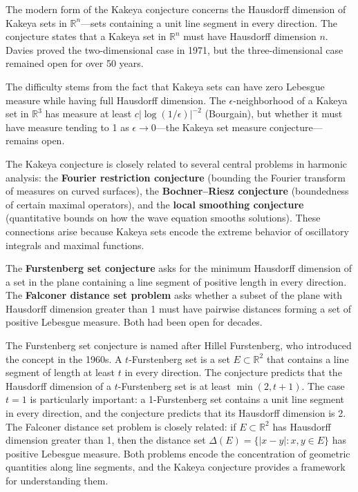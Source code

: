 The modern form of the Kakeya conjecture concerns the Hausdorff dimension of Kakeya sets in $\mathbb{R}^n$---sets containing a unit line segment in every direction. The conjecture states that a Kakeya set in $\mathbb{R}^n$ must have Hausdorff dimension $n$. Davies proved the two-dimensional case in 1971, but the three-dimensional case remained open for over 50 years.

The difficulty stems from the fact that Kakeya sets can have zero Lebesgue measure while having full Hausdorff dimension. The $\epsilon$-neighborhood of a Kakeya set in $\mathbb{R}^3$ has measure at least $c|\log(1/\epsilon)|^{-2}$ (Bourgain), but whether it must have measure tending to 1 as $\epsilon\to 0$---the Kakeya set measure conjecture---remains open.

The Kakeya conjecture is closely related to several central problems in harmonic analysis: the \textbf{Fourier restriction conjecture} (bounding the Fourier transform of measures on curved surfaces), the \textbf{Bochner--Riesz conjecture} (boundedness of certain maximal operators), and the \textbf{local smoothing conjecture} (quantitative bounds on how the wave equation smooths solutions). These connections arise because Kakeya sets encode the extreme behavior of oscillatory integrals and maximal functions.

The \textbf{Furstenberg set conjecture} asks for the minimum Hausdorff dimension of a set in the plane containing a line segment of positive length in every direction. The \textbf{Falconer distance set problem} asks whether a subset of the plane with Hausdorff dimension greater than 1 must have pairwise distances forming a set of positive Lebesgue measure. Both had been open for decades.

The Furstenberg set conjecture is named after Hillel Furstenberg, who introduced the concept in the 1960s. A $t$-Furstenberg set is a set $E \subset \mathbb{R}^2$ that contains a line segment of length at least $t$ in every direction. The conjecture predicts that the Hausdorff dimension of a $t$-Furstenberg set is at least $\min(2, t+1)$. The case $t=1$ is particularly important: a 1-Furstenberg set contains a unit line segment in every direction, and the conjecture predicts that its Hausdorff dimension is 2. The Falconer distance set problem is closely related: if $E \subset \mathbb{R}^2$ has Hausdorff dimension greater than 1, then the distance set $\Delta(E) = \{|x-y| : x, y \in E\}$ has positive Lebesgue measure. Both problems encode the concentration of geometric quantities along line segments, and the Kakeya conjecture provides a framework for understanding them.

